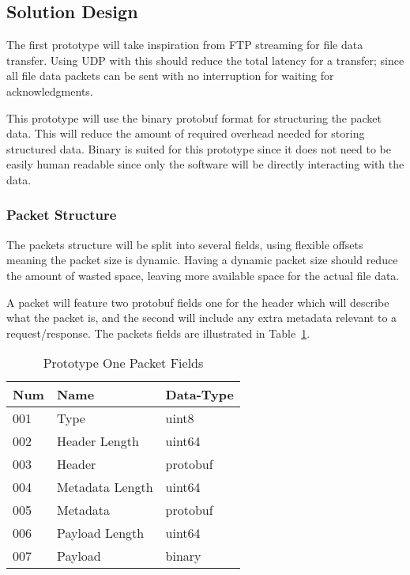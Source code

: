 \subsection*{Solution Design}
The first prototype will take inspiration from FTP streaming for file data transfer. Using UDP with this should reduce the total latency for a transfer; since all file data packets can be sent with no interruption for waiting for acknowledgments.

This prototype will use the binary protobuf format for structuring the packet data. This will reduce the amount of required overhead needed for storing structured data. Binary is suited for this prototype since it does not need to be easily human readable since only the software will be directly interacting with the data.

\subsubsection*{Packet Structure}
The packets structure will be split into several fields, using flexible offsets meaning the packet size is dynamic. Having a dynamic packet size should reduce the amount of wasted space, leaving more available space for the actual file data.

A packet will feature two protobuf fields one for the header which will describe what the packet is, and the second will include any extra metadata relevant to a request/response. The packets fields are illustrated in Table~\ref{tab:p1d-packet-fields}.

\begin{table}[h!]
    \caption{Prototype One Packet Fields}
    \label{tab:p1d-packet-fields}
    \centering
    \begin{tabular}{ l l l }
        \hline
        \textbf{Num} & \textbf{Name}   & \textbf{Data-Type} \\
        \hline
        001          & Type            & uint8              \\
        \hline
        002          & Header Length   & uint64             \\
        \hline
        003          & Header          & protobuf           \\
        \hline
        004          & Metadata Length & uint64             \\
        \hline
        005          & Metadata        & protobuf           \\
        \hline
        006          & Payload Length  & uint64             \\
        \hline
        007          & Payload         & binary             \\
        \hline
    \end{tabular}
\end{table}

